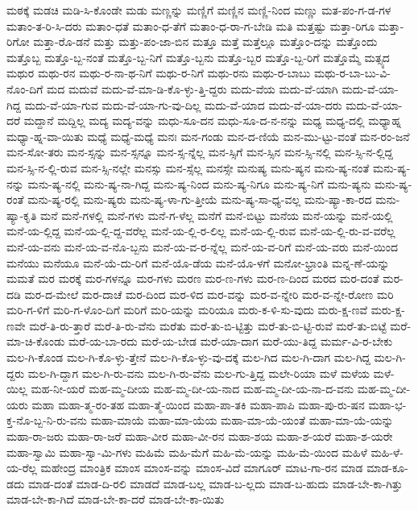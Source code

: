 {ಮಠಕ್ಕೆ
ಮಡಚಿ
ಮಡಿ-ಸಿ-ಕೊಂಡೇ
ಮಡು
ಮಣ್ಣನ್ನು
ಮಣ್ಣಿಗೆ
ಮಣ್ಣಿನ
ಮಣ್ಣಿ-ನಿಂದ
ಮಣ್ಣು
ಮತ-ಪಂ-ಗ-ಡ-ಗಳ
ಮತಾಂ-ತ-ರಿ-ಸಿ-ದರು
ಮತಾಂ-ಧತೆ
ಮತಾಂ-ಧ-ತೆಗೆ
ಮತಾಂ-ಧ-ರಾ-ಗ-ಬೇಡಿ
ಮತಿ
ಮತ್ತಷ್ಟು
ಮತ್ತಾ-ರಿಗೂ
ಮತ್ತಾ-ರಿಗೋ
ಮತ್ತಾ-ರೊ-ಡನೆ
ಮತ್ತು
ಮತ್ತು-ಪಂ-ಜಾ-ಬಿನ
ಮತ್ತೂ
ಮತ್ತೆ
ಮತ್ತೆಲ್ಲೂ
ಮತ್ತೊಂ-ದನ್ನು
ಮತ್ತೊಂದು
ಮತ್ತೊಬ್ಬ
ಮತ್ತೊ-ಬ್ಬ-ನಂತೆ
ಮತ್ತೊ-ಬ್ಬ-ನಿಗೆ
ಮತ್ತೊ-ಬ್ಬನು
ಮತ್ತೊ-ಬ್ಬರ
ಮತ್ತೊ-ಬ್ಬ-ರಿಗೆ
ಮತ್ತೊಮ್ಮೆ
ಮತ್ಸ್ಯದ
ಮಥುರ
ಮಥು-ರನ
ಮಥು-ರ-ನಾ-ಥ-ನಿಗೆ
ಮಥು-ರ-ನಿಗೆ
ಮಥು-ರನು
ಮಥು-ರ-ಬಾಬು
ಮಥು-ರ-ಬಾ-ಬು-ವಿ-ನೊಂ-ದಿಗೆ
ಮದ
ಮದುವೆ
ಮದು-ವೆ-ಮಾ-ಡಿ-ಕೊ-ಳ್ಳು-ತ್ತಿ-ದ್ದರು
ಮದು-ವೆಯ
ಮದು-ವೆ-ಯಾಗಿ
ಮದು-ವೆ-ಯಾ-ಗಿದ್ದ
ಮದು-ವೆ-ಯಾ-ಗುವ
ಮದು-ವೆ-ಯಾ-ಗು-ವು-ದಿಲ್ಲ
ಮದು-ವೆ-ಯಾದ
ಮದು-ವೆ-ಯಾ-ದರು
ಮದು-ವೆ-ಯಾ-ದರೆ
ಮದ್ದಾನೆ
ಮದ್ದಿಲ್ಲ
ಮದ್ಯ
ಮದ್ಯ-ವನ್ನು
ಮಧು-ಸೂ-ದನ
ಮಧು-ಸೂ-ದ-ನ-ನನ್ನು
ಮಧ್ಯ
ಮಧ್ಯ-ದಲ್ಲಿ
ಮಧ್ಯಾಹ್ನ
ಮಧ್ಯಾ-ಹ್ನ-ವಾ-ಯಿತು
ಮಧ್ಯೆ
ಮಧ್ಯೆ-ಮಧ್ಯೆ
ಮನಃ
ಮನ-ಗಂಡು
ಮನ-ದ-ಣಿಯೆ
ಮನ-ಮು-ಟ್ಟು-ವಂತೆ
ಮನ-ರಂ-ಜನೆ
ಮನ-ಸೋ-ತರು
ಮನ-ಸ್ಸನ್ನು
ಮನ-ಸ್ಸನ್ನೂ
ಮನ-ಸ್ಸ-ನ್ನೆಲ್ಲ
ಮನ-ಸ್ಸಿಗೆ
ಮನ-ಸ್ಸಿನ
ಮನ-ಸ್ಸಿ-ನಲ್ಲಿ
ಮನ-ಸ್ಸಿ-ನ-ಲ್ಲಿದ್ದ
ಮನ-ಸ್ಸಿ-ನ-ಲ್ಲಿ-ರುವ
ಮನ-ಸ್ಸಿ-ನಲ್ಲೇ
ಮನಸ್ಸು
ಮನ-ಸ್ಸೆಲ್ಲ
ಮನಸ್ಸೇ
ಮನುಷ್ಯ
ಮನು-ಷ್ಯನ
ಮನು-ಷ್ಯ-ನಂತೆ
ಮನು-ಷ್ಯ-ನನ್ನು
ಮನು-ಷ್ಯ-ನಲ್ಲಿ
ಮನು-ಷ್ಯ-ನಾ-ಗಿದ್ದ
ಮನು-ಷ್ಯ-ನಿಂದ
ಮನು-ಷ್ಯ-ನಿಗೂ
ಮನು-ಷ್ಯ-ನಿಗೆ
ಮನು-ಷ್ಯನು
ಮನು-ಷ್ಯ-ರಂತೆ
ಮನು-ಷ್ಯ-ರಲ್ಲಿ
ಮನು-ಷ್ಯರು
ಮನು-ಷ್ಯ-ಳಾ-ಗು-ತ್ತೀಯೆ
ಮನು-ಷ್ಯ-ಸಾ-ಧ್ಯ-ವಲ್ಲ
ಮನು-ಷ್ಯಾ-ಕಾ-ರದ
ಮನು-ಷ್ಯಾ-ಕೃತಿ
ಮನೆ
ಮನೆ-ಗಳಲ್ಲಿ
ಮನೆ-ಗಳು
ಮನೆ-ಗ-ಳೆಲ್ಲ
ಮನೆಗೆ
ಮನೆ-ಬಿಟ್ಟು
ಮನೆಯ
ಮನೆ-ಯನ್ನು
ಮನೆ-ಯಲ್ಲಿ
ಮನೆ-ಯ-ಲ್ಲಿದ್ದ
ಮನೆ-ಯ-ಲ್ಲಿ-ದ್ದ-ವರೆಲ್ಲ
ಮನೆ-ಯ-ಲ್ಲಿ-ರ-ಲಿಲ್ಲ
ಮನೆ-ಯ-ಲ್ಲಿ-ರುವ
ಮನೆ-ಯ-ಲ್ಲಿ-ರು-ವ-ವರೆಲ್ಲ
ಮನೆ-ಯ-ವನು
ಮನೆ-ಯ-ವ-ನೊ-ಬ್ಬನು
ಮನೆ-ಯ-ವ-ರ-ನ್ನೆಲ್ಲ
ಮನೆ-ಯ-ವ-ರಿಗೆ
ಮನೆ-ಯ-ವರು
ಮನೆ-ಯಿಂದ
ಮನೆಯು
ಮನೆಯೂ
ಮನೆ-ಯೆ-ದು-ರಿಗೆ
ಮನೆ-ಯೊ-ಡೆಯ
ಮನೆ-ಯೊ-ಳಗೆ
ಮನೋ-ಭ್ರಾಂತಿ
ಮನ್ನ-ಣೆ-ಯನ್ನು
ಮಮತೆ
ಮರ
ಮರಕ್ಕೆ
ಮರ-ಗಳನ್ನೂ
ಮರ-ಗಳು
ಮರಣ
ಮರ-ಣ-ಗಳು
ಮರ-ಣ-ದಿಂದ
ಮರದ
ಮರ-ದಂತೆ
ಮರ-ದಡಿ
ಮರ-ದ-ಮೇಲೆ
ಮರ-ದಾಚೆ
ಮರ-ದಿಂದ
ಮರ-ಳಿದ
ಮರ-ವನ್ನು
ಮರ-ವ-ನ್ನೇರಿ
ಮರ-ವ-ನ್ನೇ-ರೋಣ
ಮರಿ
ಮರಿ-ಗ-ಳಿಗೆ
ಮರಿ-ಗ-ಳೊಂ-ದಿಗೆ
ಮರಿಗೆ
ಮರಿ-ಯನ್ನು
ಮರಿಯೂ
ಮರು-ಕ-ಳಿ-ಸು-ವುದು
ಮರು-ಕ್ಷ-ಣವೆ
ಮರು-ಕ್ಷ-ಣವೇ
ಮರೆ-ತಿ-ರು-ತ್ತಾರೆ
ಮರೆ-ತಿ-ರು-ವೆನು
ಮರೆತು
ಮರೆ-ತು-ಬಿ-ಟ್ಟಿತ್ತು
ಮರೆ-ತು-ಬಿ-ಟ್ಟಿ-ರುವೆ
ಮರೆ-ತು-ಬಿಟ್ಟೆ
ಮರೆ-ಮಾ-ಚಿ-ಕೊಂಡು
ಮರೆ-ಯ-ಬಾ-ರದು
ಮರೆ-ಯ-ಬೇಡ
ಮರೆ-ಯಾ-ದಾಗ
ಮರೆ-ಯು-ತಿದ್ದ
ಮರ್ಮ-ವಿ-ರ-ಬೇಕು
ಮಲ-ಗಿ-ಕೊಂಡ
ಮಲ-ಗಿ-ಕೊ-ಳ್ಳು-ತ್ತೇನೆ
ಮಲ-ಗಿ-ಕೊ-ಳ್ಳು-ವು-ದಕ್ಕೆ
ಮಲ-ಗಿದ
ಮಲ-ಗಿ-ದಾಗ
ಮಲ-ಗಿದ್ದ
ಮಲ-ಗಿ-ದ್ದರು
ಮಲ-ಗಿ-ದ್ದಾಗ
ಮಲ-ಗಿ-ರು-ವನು
ಮಲ-ಗಿ-ರು-ವೆನು
ಮಲ-ಗು-ತ್ತಿದ್ದ
ಮಲೇ-ರಿಯಾ
ಮಳೆ
ಮಳೆಯ
ಮಳೆ-ಯಿಲ್ಲ
ಮಹ-ನೀ-ಯರೆ
ಮಹ-ಮ್ಮ-ದೀಯ
ಮಹ-ಮ್ಮ-ದೀ-ಯ-ನಾದ
ಮಹ-ಮ್ಮ-ದೀ-ಯ-ನಾ-ದ-ವನು
ಮಹ-ಮ್ಮ-ದೀ-ಯರು
ಮಹಾ
ಮಹಾ-ತ್ಮ-ರಂ-ತಹ
ಮಹಾ-ತ್ಮೆ-ಯಿಂದ
ಮಹಾ-ಪಾ-ತಕಿ
ಮಹಾ-ಪಾಪಿ
ಮಹಾ-ಪು-ರು-ಷನ
ಮಹಾ-ಭ-ಕ್ತ-ನೊ-ಬ್ಬ-ನಿ-ರು-ವನು
ಮಹಾ-ಮಾಯೆ
ಮಹಾ-ಮಾ-ಯೆಯ
ಮಹಾ-ಮಾ-ಯೆ-ಯಂತೆ
ಮಹಾ-ಮಾ-ಯೆ-ಯನ್ನು
ಮಹಾ-ರಾ-ಜರು
ಮಹಾ-ರಾ-ಜರೆ
ಮಹಾ-ವೀರ
ಮಹಾ-ವೀ-ರನ
ಮಹಾ-ಶಯ
ಮಹಾ-ಶ-ಯರೆ
ಮಹಾ-ಶ-ಯರೇ
ಮಹಾ-ಸ್ವಾಮಿ
ಮಹಾ-ಸ್ವಾ-ಮಿ-ಗಳು
ಮಹಿಮೆ
ಮಹಿ-ಮೆಗೆ
ಮಹಿ-ಮೆ-ಯನ್ನು
ಮಹಿ-ಮೆ-ಯಿಂದ
ಮಹಿಳೆ
ಮಹಿ-ಳೆ-ಯ-ರೆಲ್ಲ
ಮಹೇಂದ್ರ
ಮಾಂತ್ರಿಕ
ಮಾಂಸ
ಮಾಂಸ-ವನ್ನು
ಮಾಂಸ-ವಿದೆ
ಮಾಗೂರ್
ಮಾಟ-ಗಾ-ರನ
ಮಾಡ
ಮಾಡ-ಕೂ-ಡದು
ಮಾಡ-ದಂತೆ
ಮಾಡ-ದಿ-ರಲಿ
ಮಾಡದೆ
ಮಾಡ-ಬಲ್ಲ
ಮಾಡ-ಬ-ಲ್ಲದು
ಮಾಡ-ಬ-ಹುದು
ಮಾಡ-ಬೇ-ಕಾ-ಗಿತ್ತು
ಮಾಡ-ಬೇ-ಕಾ-ಗಿದೆ
ಮಾಡ-ಬೇ-ಕಾ-ದರೆ
ಮಾಡ-ಬೇ-ಕಾ-ಯಿತು
}
